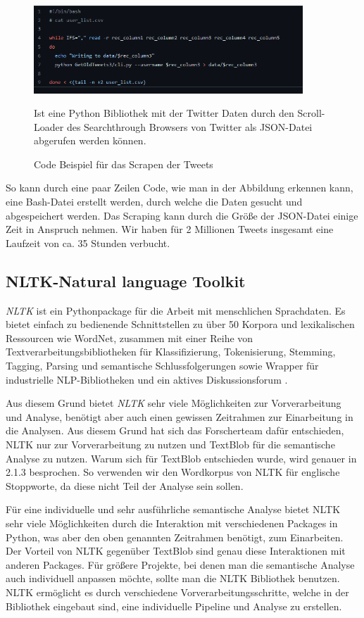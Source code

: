 	
	\begin{figure}[ht]
		\centering
		\includegraphics[width=0.9\textwidth]{images/Kapitel2/Code_Beispiel_1}
			\caption{\label{fig:CodeBeispiel}Code Beispiel für das Scrapen der Tweets}{Ist eine Python Bibliothek mit der Twitter Daten durch den Scroll-Loader des Searchthrough Browsers von Twitter als JSON-Datei abgerufen werden können.}
	\end{figure}
	
So kann durch eine paar Zeilen Code, wie man in der Abbildung \label{CodeBeispiel} erkennen kann, eine Bash-Datei erstellt werden, durch welche die Daten gesucht und abgespeichert werden. Das Scraping kann durch die Größe der JSON-Datei einige Zeit in Anspruch nehmen. Wir haben für 2 Millionen Tweets insgesamt eine Laufzeit von ca. 35 Stunden verbucht.

	\subsection{NLTK-Natural language Toolkit}
	
\textit{NLTK} ist ein Pythonpackage für die Arbeit mit menschlichen Sprachdaten. Es bietet einfach zu bedienende Schnittstellen zu über 50 Korpora und lexikalischen Ressourcen wie WordNet, zusammen mit einer Reihe von Textverarbeitungsbibliotheken für Klassifizierung, Tokenisierung, Stemming, Tagging, Parsing und semantische Schlussfolgerungen sowie Wrapper für industrielle NLP-Bibliotheken und ein aktives Diskussionsforum .
	
	
Aus diesem Grund bietet \textit{NLTK} sehr viele Möglichkeiten zur Vorverarbeitung und Analyse, benötigt aber auch einen gewissen Zeitrahmen zur Einarbeitung in die Analysen. Aus diesem Grund hat sich das Forscherteam dafür entschieden, NLTK nur zur Vorverarbeitung zu nutzen und TextBlob für die semantische Analyse zu nutzen. Warum sich für TextBlob entschieden wurde, wird genauer in 2.1.3 besprochen. So verwenden wir den Wordkorpus von NLTK für englische Stoppworte, da diese nicht Teil der Analyse sein sollen.
	
Für eine individuelle und sehr ausführliche semantische Analyse bietet NLTK sehr viele Möglichkeiten durch die Interaktion mit verschiedenen Packages in Python, was aber den oben genannten Zeitrahmen benötigt, zum Einarbeiten. Der Vorteil von NLTK gegenüber TextBlob sind genau diese Interaktionen mit anderen Packages. Für größere Projekte, bei denen man die semantische Analyse auch individuell anpassen möchte, sollte man die NLTK Bibliothek benutzen. NLTK ermöglicht es durch verschiedene Vorverarbeitungsschritte, welche in der Bibliothek eingebaut sind, eine individuelle Pipeline und Analyse zu erstellen.
	
